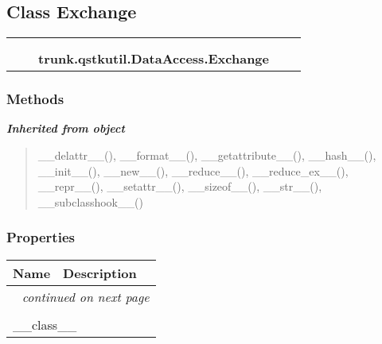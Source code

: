 \subsection{Class Exchange}

    \label{trunk:qstkutil:DataAccess:Exchange}
\begin{tabular}{cccccc}
\multicolumn{2}{r}{\settowidth{\BCL}{object}\multirow{2}{\BCL}{object}}
&&
  \\\cline{3-3}
  &&\multicolumn{1}{c|}{}
&&
  \\
&&\multicolumn{2}{l}{\textbf{trunk.qstkutil.DataAccess.Exchange}}
\end{tabular}



  \subsubsection{Methods}


\large{\textbf{\textit{Inherited from object}}}

\begin{quote}
\_\_delattr\_\_(), \_\_format\_\_(), \_\_getattribute\_\_(), \_\_hash\_\_(), \_\_init\_\_(), \_\_new\_\_(), \_\_reduce\_\_(), \_\_reduce\_ex\_\_(), \_\_repr\_\_(), \_\_setattr\_\_(), \_\_sizeof\_\_(), \_\_str\_\_(), \_\_subclasshook\_\_()
\end{quote}


  \subsubsection{Properties}

    \vspace{-1cm}
\hspace{\varindent}\begin{longtable}{|p{\varnamewidth}|p{\vardescrwidth}|l}
\cline{1-2}
\cline{1-2} \centering \textbf{Name} & \centering \textbf{Description}& \\
\cline{1-2}
\endhead\cline{1-2}\multicolumn{3}{r}{\small\textit{continued on next page}}\\\endfoot\cline{1-2}
\endlastfoot\multicolumn{2}{|l|}{\textit{Inherited from object}}\\
\multicolumn{2}{|p{\varwidth}|}{\raggedright \_\_class\_\_}\\
\cline{1-2}
\end{longtable}


